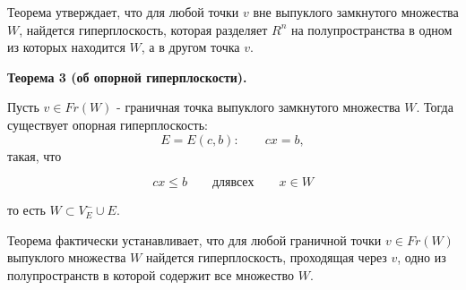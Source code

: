\documentclass[14pt, letterpaper]{article}
\begin{document}
Теорема утверждает, что для любой точки $v$ вне выпуклого замкнутого множества $W$, найдется гиперплоскость, которая разделяет $R^{n}$ на полупространства в одном из которых находится $W$, а в другом точка $v$.

\textbf{Теорема 3 (об опорной гиперплоскости).}

Пусть $v \in Fr(W)$ - граничная точка выпуклого замкнутого множества $W$. Тогда существует опорная гиперплоскость:
$$E = E(c, b): \qquad cx = b,$$
такая, что

$$cx \leq b \qquad для всех \qquad x \in W$$

то есть $W \subset V^{-}_{E} \cup E.$

Теорема фактически устанавливает, что для любой граничной точки $v \in Fr(W)$ выпуклого множества $W$ найдется гиперплоскость, проходящая через $v$, одно из полупространств в которой содержит все множество $W$.
\end{document}

